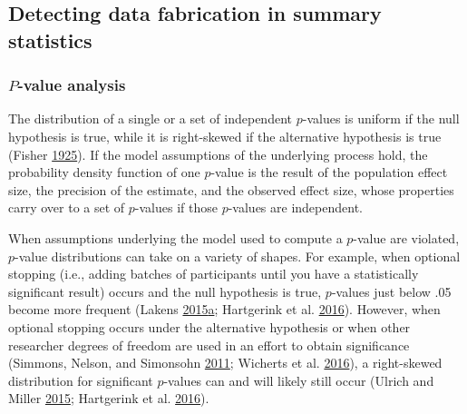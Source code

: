 \documentclass[a5paper]{book}
\begin{document}
\subsection{Detecting data fabrication in summary
statistics}\label{detecting-data-fabrication-in-summary-statistics}

\subsubsection{\texorpdfstring{\(P\)-value
analysis}{P-value analysis}}\label{p-value-analysis}

The distribution of a single or a set of independent \(p\)-values is
uniform if the null hypothesis is true, while it is right-skewed if the
alternative hypothesis is true (Fisher
\protect\hyperlink{ref-Fisher1925-jl}{1925}). If the model assumptions
of the underlying process hold, the probability density function of one
\(p\)-value is the result of the population effect size, the precision
of the estimate, and the observed effect size, whose properties carry
over to a set of \(p\)-values if those \(p\)-values are independent.

When assumptions underlying the model used to compute a \(p\)-value are
violated, \(p\)-value distributions can take on a variety of shapes. For
example, when optional stopping (i.e., adding batches of participants
until you have a statistically significant result) occurs and the null
hypothesis is true, \(p\)-values just below .05 become more frequent
(Lakens
\protect\hyperlink{ref-doi:10.1080ux2f17470218.2014.982664}{2015}\protect\hyperlink{ref-doi:10.1080ux2f17470218.2014.982664}{a};
Hartgerink et al.
\protect\hyperlink{ref-doi:10.7717ux2fpeerj.1935}{2016}). However, when
optional stopping occurs under the alternative hypothesis or when other
researcher degrees of freedom are used in an effort to obtain
significance (Simmons, Nelson, and Simonsohn
\protect\hyperlink{ref-doi:10.1177ux2f0956797611417632}{2011}; Wicherts
et al. \protect\hyperlink{ref-doi:10.3389ux2ffpsyg.2016.01832}{2016}), a
right-skewed distribution for significant \(p\)-values can and will
likely still occur (Ulrich and Miller
\protect\hyperlink{ref-doi:10.1037ux2fxge0000086}{2015}; Hartgerink et
al. \protect\hyperlink{ref-doi:10.7717ux2fpeerj.1935}{2016}).
\end{document}
